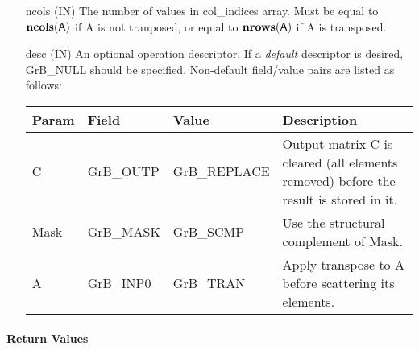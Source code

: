 \begin{itemize}[leftmargin=1in]
    \item[{\sf ncols}] ({\sf IN}) The number of values in {\sf col\_indices} 
	array. Must be equal to $\bold{ncols}({\sf A})$ if {\sf A} is not tranposed,
	or equal to $\bold{nrows}({\sf A})$ if {\sf A} is transposed.

    \item[{\sf desc}] ({\sf IN}) An optional operation descriptor. If
    a \emph{default} descriptor is desired, {\sf GrB\_NULL} should be
    specified. Non-default field/value pairs are listed as follows:  \\

    \begin{tabular}{lllp{2.5in}}
        Param & Field  & Value & Description \\
        \hline
        {\sf C}    & {\sf GrB\_OUTP} & {\sf GrB\_REPLACE} & Output matrix {\sf C}
        is cleared (all elements removed) before the result is stored in it. \\
        
        {\sf Mask} & {\sf GrB\_MASK} & {\sf GrB\_SCMP}   & Use the structural 
        complement of {\sf Mask}. \\

        {\sf A}    & {\sf GrB\_INP0} & {\sf GrB\_TRAN}   & Apply transpose to 
        {\sf A} before scattering its elements.
    \end{tabular}
\end{itemize}

\paragraph{Return Values}

